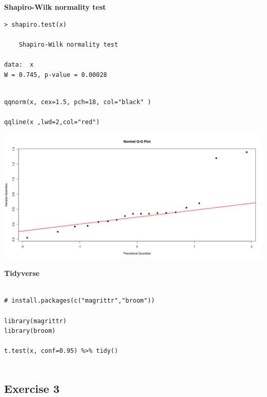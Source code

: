 \documentclass[a4paper,12pt]{article}
\begin{document}
\noindent \textbf{Shapiro-Wilk normality test}

\begin{framed}\begin{verbatim}
> shapiro.test(x)

	Shapiro-Wilk normality test

data:  x
W = 0.745, p-value = 0.00028
\end{verbatim} \end{framed}

\newpage 
\begin{framed}\begin{verbatim}

qqnorm(x, cex=1.5, pch=18, col="black" )

qqline(x ,lwd=2,col="red")

\end{verbatim} \end{framed}

\includegraphics[scale=0.45]{00-C1/images/00-C1-Q1-qqnorm.png}
\newpage 

\noindent \textbf{Tidyverse}

\begin{framed}\begin{verbatim}

# install.packages(c("magrittr","broom"))

library(magrittr)
library(broom)

t.test(x, conf=0.95) %>% tidy()


\end{verbatim} \end{framed}




\newpage

\subsection*{Exercise 3}
\end{document}
